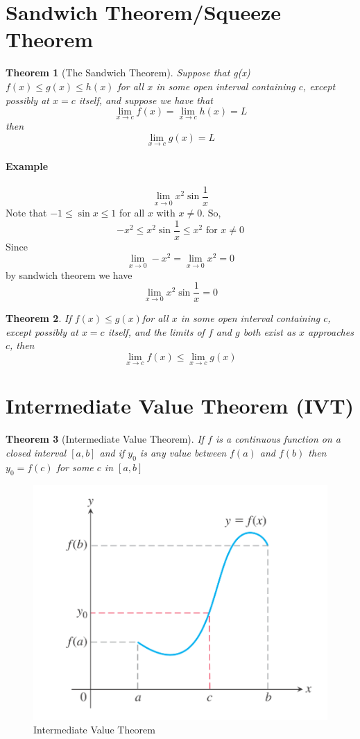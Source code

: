 \documentclass[12pt]{article}
\newtheorem{theorem}{Theorem}
\begin{document}
\section{Sandwich Theorem/Squeeze Theorem}
\begin{theorem}[The Sandwich Theorem] 
    Suppose that g(x) $f(x) \leq g(x) \leq h(x)$ for all $x$ in some open interval containing
    $c$, except possibly at $x = c$ itself, and suppose we have that
    \[
        \lim_{x \to c} f(x) = \lim_{x \to c} h(x) = L
    \]
    then
    \[
        \lim_{x \to c} g(x) = L
    \]
\end{theorem}

\paragraph{Example} 
\[
    \lim_{x \to 0} x^2 \sin{\frac{1}{x}}
\]
Note that $-1 \leq \sin x \leq 1$ for all $x$ with $x \neq 0$. So,
\[
    - x^2 \leq x^2 \sin {\frac{1}{x}} \leq x^2 \textrm{ for } x \neq 0
\]
Since
\[
    \lim_{x \to 0} - x^2 = \lim_{x \to 0} x^2 = 0
\]
by sandwich theorem we have
\[
    \lim_{x \to 0} x^2 \sin{\frac{1}{x}} = 0
\]

\begin{theorem}
    If $f(x) \leq g(x)$for all $x$ in some open interval containing $c$, except
    possibly at $x = c$ itself, and the limits of $f$ and $g$ both exist as $x$ approaches $c$,
    then
    \[
        \lim_{x \to c} f(x) \leq \lim_{x \to c} g(x) 
    \]
\end{theorem}

\section{Intermediate Value Theorem (IVT)}
\begin{theorem}[Intermediate Value Theorem]
    If $f$ is a continuous function on a closed interval $[a,b]$ and if $y_0$ is any value
    between $f(a)$ and $f(b)$ then $y_0 = f(c)$ for some $c$ in $[a,b]$
\end{theorem}

\begin{figure}[h!] 
    \centering
    \includegraphics[width = 0.5\linewidth]{Images/ivt.png}
    \caption{Intermediate Value Theorem}
\end{figure}
\end{document}
